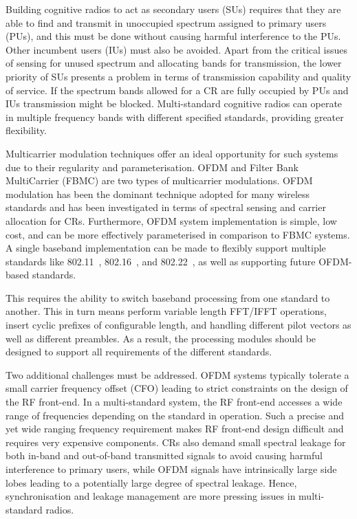 Building cognitive radios to act as secondary users (SUs) requires that they are able to find and transmit in unoccupied spectrum assigned to primary users (PUs), and this must be done without causing harmful interference to the PUs.
Other incumbent users (IUs) must also be avoided.
Apart from the critical issues of sensing for unused spectrum and allocating bands for transmission, the lower priority of SUs presents a problem in terms of transmission capability and quality of service.
If the spectrum bands allowed for a CR are fully occupied by PUs and IUs transmission might be blocked.
Multi-standard cognitive radios can operate in multiple frequency bands with different specified standards, providing greater flexibility.

Multicarrier modulation techniques offer an ideal opportunity for such systems due to their regularity and parameterisation. OFDM and Filter Bank MultiCarrier (FBMC) are two types of multicarrier modulations.
OFDM modulation has been the dominant technique adopted for many wireless standards and has been investigated in terms of spectral sensing and carrier allocation for CRs.
Furthermore, OFDM system implementation is simple, low cost, and can be more effectively parameterised in comparison to FBMC systems.
A single baseband implementation can be made to flexibly support multiple standards like 802.11~\cite{IEEE80211}, 802.16~\cite{IEEE80216}, and 802.22~\cite{IEEE80222}, as well as supporting future OFDM-based standards.

This requires the ability to switch baseband processing from one standard to another. This in turn means perform variable length FFT/IFFT operations, insert cyclic prefixes of configurable length, and handling different pilot vectors as well as different preambles. As a result, the processing modules should be designed to support all requirements of the different standards.

Two additional challenges must be addressed.
OFDM systems typically tolerate a small carrier frequency offset (CFO) leading to strict constraints on the design of the RF front-end.
In a multi-standard system, the RF front-end accesses a wide range of frequencies depending on the standard in operation. Such a precise and yet wide ranging frequency requirement makes RF front-end design difficult and requires very expensive components.
CRs also demand small spectral leakage for both in-band and out-of-band transmitted signals to avoid causing harmful interference to primary users, while OFDM signals have intrinsically large side lobes leading to a potentially large degree of spectral leakage.
Hence, synchronisation and leakage management are more pressing issues in multi-standard radios.

